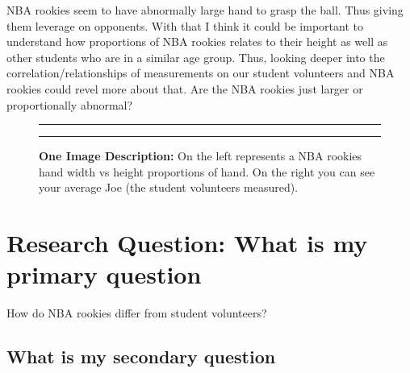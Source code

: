 \documentclass[]{article}
\begin{document}
NBA rookies seem to have abnormally large hand to grasp the ball. Thus
giving them leverage on opponents. With that I think it could be
important to understand how proportions of NBA rookies relates to their
height as well as other students who are in a similar age group. Thus,
looking deeper into the correlation/relationships of measurements on our
student volunteers and NBA rookies could revel more about that. Are the
NBA rookies just larger or proportionally abnormal?

\begin{figure}[!ht]
    \hrule
    \begin{center}
    \end{center}
    \label{fig:oneimage-1}
    \caption{ \textbf{One Image Description:} On the left represents a NBA rookies hand width vs height proportions of hand. On the right you can see your average Joe (the student volunteers measured).}
    \hrule
\end{figure}

\newpage

\section{Research Question:  What is my primary question}
\label{sec:rq}

How do NBA rookies differ from student volunteers?

\subsection{What is my secondary question}
\label{sec:rq2}
\end{document}
